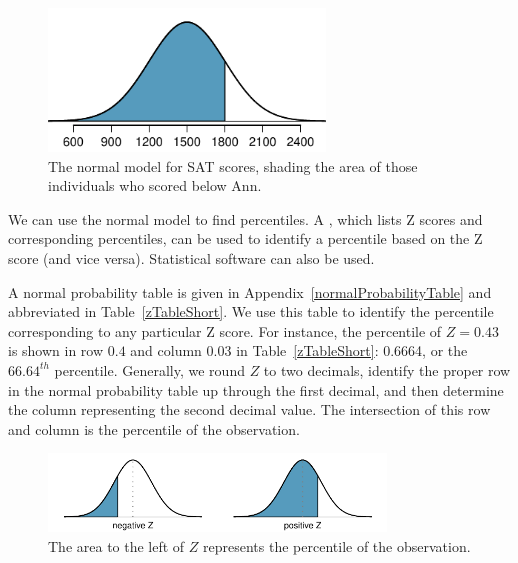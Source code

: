 \begin{figure}[H]
   \centering
   \includegraphics[height=1.5in]{03/figures/satBelow1800/satBelow1800}
   \caption{The normal model for SAT scores, shading the area of those individuals who scored below Ann.}
   \label{satBelow1800}
\end{figure}

We can use the normal model to find percentiles. A , which lists Z scores and corresponding percentiles, can be used to identify a percentile based on the Z score (and vice versa). Statistical software can also be used.

A normal probability table is given in Appendix~\vref{normalProbabilityTable} and abbreviated in Table~\ref{zTableShort}. We use this table to identify the percentile corresponding to any particular Z score. For instance, the percentile of $Z=0.43$ is shown in row $0.4$ and column $0.03$ in Table~\ref{zTableShort}: 0.6664, or the $66.64^{th}$ percentile. Generally, we round $Z$ to two decimals, identify the proper row in the normal probability table up through the first decimal, and then determine the column representing the second decimal value. The intersection of this row and column is the percentile of the observation.

\begin{figure}[H]
\centering
\includegraphics[width=0.8\textwidth]{03/figures/normalTails/normalTails}
\caption{The area to the left of $Z$ represents the percentile of the observation.}
\label{normalTails}
\end{figure}

